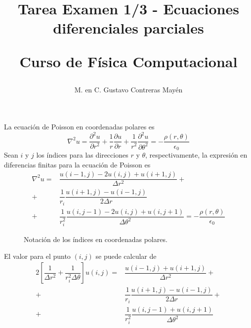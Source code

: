 \documentclass[letterpaper]{article}
\title{Tarea Examen 1/3 - Ecuaciones diferenciales parciales \\ \begin{large}Curso de Física Computacional\end{large}}
\author{M. en C. Gustavo Contreras Mayén}
\date{ }
\begin{document}
\maketitle
\fontsize{14}{14}\selectfont
{}
La ecuación de Poisson en coordenadas polares es
\[ \nabla^{2} u = \dfrac{\partial^{2}u}{\partial r^{2}} + \dfrac{1}{r} \dfrac{\partial u}{\partial r} + \dfrac{1}{r^{2}} \dfrac{\partial^{2}u}{\partial \theta^{2}} = - \dfrac{\rho (r,\theta)}{\epsilon_{0}} \]
Sean $i$ y $j$ los índices para las direcciones $r$ y $\theta$, respectivamente, la expresión en diferencias finitas para la ecuación de Poisson es
\[ \begin{split}
 \nabla^{2} u =& \dfrac{u(i-1,j)-2u(i,j)+ u(i+1,j)}{\Delta r^{2}} + \\
 +& \dfrac{1}{r_{i}} \dfrac{u(i+1,j)-u(i-1,j)}{2\Delta r} \\
 +& \dfrac{1}{r_{i}^{2}} \dfrac{u(i,j-1)- 2u(i,j)+u(i,j+1)}{\Delta \theta^{2}} = - \dfrac{\rho (r,\theta)}{\epsilon_{0}}
\end{split} \]
\begin{figure}[H]
\begin{center}
\end{center}
\caption{Notación de los índices en coordenadas polares.}
\label{fig:mediocirculo}
\end{figure}
El valor para el punto $(i,j)$ se puede calcular de
\[ \begin{split}
 2 \left[ \dfrac{1}{\Delta r^{2}} + \dfrac{1}{r^{2}_{i}\Delta \theta} \right] u(i,j) =& \dfrac{u(i-1,j)+u(i+1,j)}{\Delta r^{2}} + \\ 
+& \dfrac{1}{r_{i}} \dfrac{u(i+1,j)-u(i-1,j)}{2 \Delta r} + \\
+& \dfrac{1}{r_{i}^{2}} \dfrac{u(i,j-1)+u(i,j+1)}{\Delta \theta^{2}}
\end{split} \]
\end{document}
